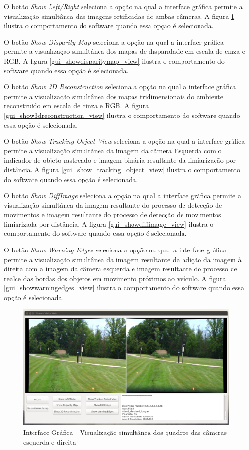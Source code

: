 O botão \textit{Show Left/Right} seleciona a opção na qual a interface gráfica permite a visualização simultânea das imagens retificadas de ambas câmeras. A figura \ref{gui_showleftright_view} 
ilustra o comportamento do software quando essa opção é selecionada. 

O botão \textit{Show Disparity Map} seleciona a opção na qual a interface gráfica permite a visualização simultânea dos mapas de disparidade em escala de cinza e RGB. A figura 
\ref{gui_showdisparitymap_view} ilustra o comportamento do software quando essa opção é selecionada. 

O botão \textit{Show 3D Reconstruction} seleciona a opção na qual a interface gráfica permite a visualização simultânea dos mapas tridimensionais do ambiente reconstruído em escala de cinza e 
RGB. A figura \ref{gui_show3dreconstruction_view} ilustra o comportamento do software quando essa opção é selecionada. 

O botão \textit{Show Tracking Object View} seleciona a opção na qual a interface gráfica permite a visualização simultânea da imagem da câmera Esquerda com o indicador de objeto rastreado e 
imagem binária resultante da limiarização por distância. A figura \ref{gui_show_tracking_object_view} ilustra o comportamento do software quando essa opção é selecionada. 

O botão \textit{Show DiffImage} seleciona a opção na qual a interface gráfica permite a visualização simultânea da imagem resultante do processo de detecção de movimentos e imagem resultante do 
processo de detecção de movimentos limiarizada por distância. A figura \ref{gui_showdiffimage_view} ilustra o comportamento do software quando essa opção é selecionada. 

O botão \textit{Show Warning Edges} seleciona a opção na qual a interface gráfica permite a visualização simultânea da imagem resultante da adição da imagem à direita com a imagem da câmera esquerda e imagem resultante do processo de realce das bordas dos objetos em movimento próximos ao veículo. A figura \ref{gui_showwarningedges_view} ilustra o comportamento do software quando essa opção é selecionada. 


\begin{figure}[H]
 	\centering
 	\includegraphics[scale=0.35]{./Resources/gui_showleftright_view.png}
 	\caption{Interface Gráfica - Visualização simultânea dos quadros das câmeras esquerda e direita}
 	\label{gui_showleftright_view}
\end{figure}


